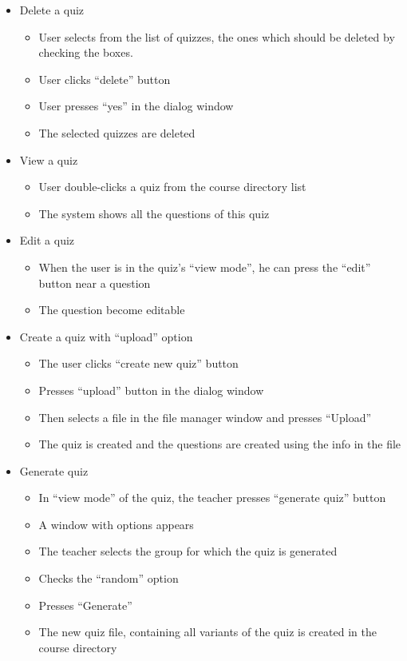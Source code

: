 \begin{itemize}
  \item Delete a quiz
  \begin{itemize}
    \item User selects from the list of quizzes, the ones which should be deleted by checking the boxes.
    \item User clicks “delete” button
    \item User presses “yes” in the dialog window
    \item The selected quizzes are deleted
  \end{itemize}    

  \item View a quiz
  \begin{itemize}
    \item User double-clicks a quiz from the course directory list
    \item The system shows all the questions of this quiz
  \end{itemize}    

  \item Edit a quiz
  \begin{itemize}
    \item When the user is in the quiz’s “view mode”, he can press the “edit” button near a question
    \item The question become editable
  \end{itemize}    

  \item Create a quiz with “upload” option
  \begin{itemize}
    \item The user clicks “create new quiz” button
    \item Presses “upload” button in the dialog window
    \item Then selects a file in the file manager window and presses “Upload”
    \item The quiz is created and the questions are created using the info in the file
  \end{itemize}

  \item Generate quiz
  \begin{itemize}
    \item In “view mode” of the quiz, the teacher presses “generate quiz” button
    \item A window with options appears
    \item The teacher selects the group for which the quiz is generated
    \item Checks the “random” option
    \item Presses “Generate”
    \item The new quiz file, containing all variants of the quiz is created in the course directory
  \end{itemize}


\end{itemize}
